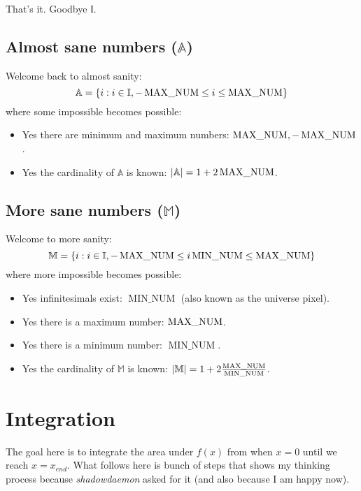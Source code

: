 \documentclass{report}
\DeclareMathOperator{\minnum}{MIN\_NUM}
\begin{document}
That's it. Goodbye $\mathbb{I}$.


\section{Almost sane numbers ($\mathbb{A}$)}
Welcome back to almost sanity:
\[
    \mathbb{A} = \{i : i \in \mathbb{I}, -\operatorname{MAX\_NUM} \le i \le \operatorname{MAX\_NUM}\}
\]
where some impossible becomes possible:
\begin{itemize}
    \item Yes there are minimum and maximum numbers: $\operatorname{MAX\_NUM}, -\operatorname{MAX\_NUM}$.
    \item Yes the cardinality of $\mathbb{A}$ is known: $|\mathbb{A}| = 1 +
    2\operatorname{MAX\_NUM}$.
\end{itemize}


\section{More sane numbers ($\mathbb{M}$)}
Welcome to more sanity:
\[
    \mathbb{M} = \{i : i \in \mathbb{I}, -\maxnum \le i\minnum \le \maxnum\}
\]
where more impossible becomes possible:
\begin{itemize}
    \item Yes infinitesimals exist: $\minnum$ (also known as the universe pixel).
    \item Yes there is a maximum number: $\operatorname{MAX\_NUM}$.
    \item Yes there is a minimum number: $\minnum$.
    \item Yes the cardinality of $\mathbb{M}$ is known: $|\mathbb{M}| = 1 +
    2\frac{\maxnum}{\minnum}$.
\end{itemize}



\chapter{Integration}
The goal here is to integrate the area under $f(x)$ from when $x = 0$ until we
reach $x = x_{end}$. What follows here is bunch of steps that shows my thinking
process because \emph{shadowdaemon} asked for it (and also because I am happy now).
\end{document}
